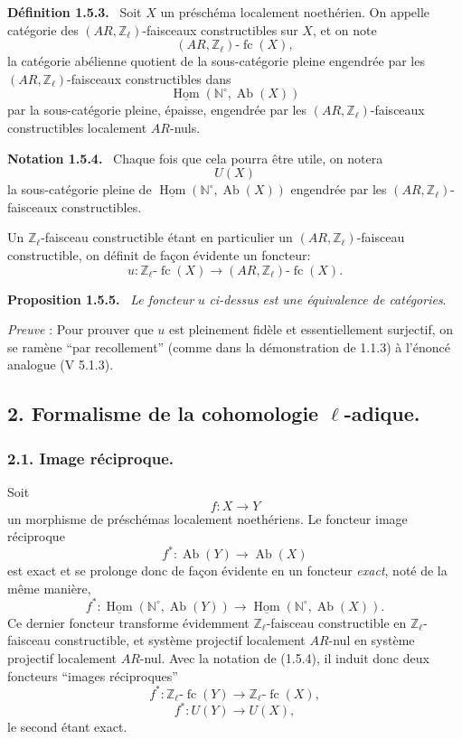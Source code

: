 \documentclass[11pt]{article}
\newenvironment{statement}[1]{\par\medskip\noindent\textbf{#1.}\ }{\par\medskip}
\DeclareMathOperator{\Hom}{Hom}
\providecommand{\uHom}{\underline{\Hom}}
\providecommand{\Hom}{\operatorname{Hom}}
\providecommand{\Ab}{\operatorname{Ab}}
\providecommand{\fc}{\operatorname{fc}}
\providecommand{\Ab}{\operatorname{Ab}}
\providecommand{\Hom}{\operatorname{Hom}}
\begin{document}
\begin{statement}{Définition 1.5.3}
Soit \(X\) un préschéma localement noethérien. On appelle catégorie des \((AR,\mathbb Z_\ell)\)-faisceaux constructibles sur \(X\), et on note
\[
(AR,\mathbb Z_\ell)\text{-}\fc(X),
\]
la
catégorie abélienne quotient de la sous-catégorie pleine engendrée par les \((AR,\mathbb Z_\ell)\)-faisceaux constructibles dans
\[
\uHom(\mathbb N^\circ,\Ab(X))
\]
par la sous-catégorie pleine, épaisse, engendrée par les \((AR,\mathbb Z_\ell)\)-faisceaux constructibles localement \(AR\)-nuls.
\end{statement}

\begin{statement}{Notation 1.5.4}
Chaque fois que cela pourra être utile, on notera
\[
U(X)
\]
la sous-catégorie pleine de \(\uHom(\mathbb N^\circ,\Ab(X))\) engendrée par les \((AR,\mathbb Z_\ell)\)-faisceaux constructibles.
\end{statement}

Un \(\mathbb Z_\ell\)-faisceau constructible étant en particulier un \((AR,\mathbb Z_\ell)\)-faisceau constructible, on définit de façon évidente un foncteur:
\[
u:\mathbb Z_\ell\text{-}\fc(X)\longrightarrow (AR,\mathbb Z_\ell)\text{-}\fc(X).
\]

\begin{statement}{Proposition 1.5.5}
\emph{Le foncteur} \(u\) \emph{ci-dessus est une équivalence de catégories}.
\end{statement}

\emph{Preuve} : Pour prouver que \(u\) est pleinement fidèle et essentiellement surjectif, on se ramène ``par recollement'' (comme dans la démonstration de 1.1.3) à l'énoncé analogue (V 5.1.3).

\subsection*{2. Formalisme de la cohomologie \(\ell\)-adique.}

\subsubsection*{2.1. Image réciproque.}

Soit
\[
f:X\longrightarrow Y
\]
un morphisme de préschémas localement noethériens. Le foncteur image réciproque
\[
f^*:\Ab(Y)\longrightarrow \Ab(X)
\]
est exact et se prolonge donc de façon évidente en un foncteur \emph{exact}, noté de la même manière,
\[
f^*:\uHom(\mathbb N^\circ,\Ab(Y))\longrightarrow \uHom(\mathbb N^\circ,\Ab(X)).
\]
Ce dernier foncteur transforme évidemment \(\mathbb Z_\ell\)-faisceau constructible en \(\mathbb Z_\ell\)-faisceau constructible, et système projectif localement \(AR\)-nul en système projectif localement \(AR\)-nul. Avec la notation de (1.5.4), il induit donc deux foncteurs ``images réciproques''
\[
f^*:\mathbb Z_\ell\text{-}\fc(Y)\longrightarrow \mathbb Z_\ell\text{-}\fc(X),
\]
\[
f^*:U(Y)\longrightarrow U(X),
\]
le second étant exact.
\end{document}
